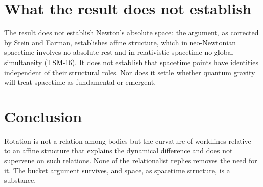 \documentclass{situationist-preprint}
\begin{document}
\section{What the result does not establish}

The result does not establish Newton's absolute space: the argument, as corrected by Stein and Earman, establishes affine structure, which in neo-Newtonian spacetime involves no absolute rest and in relativistic spacetime no global simultaneity (TSM-16). It does not establish that spacetime points have identities independent of their structural roles. Nor does it settle whether quantum gravity will treat spacetime as fundamental or emergent.

\section{Conclusion}

Rotation is not a relation among bodies but the curvature of worldlines relative to an affine structure that explains the dynamical difference and does not supervene on such relations. None of the relationalist replies removes the need for it. The bucket argument survives, and space, as spacetime structure, is a substance.
\end{document}
